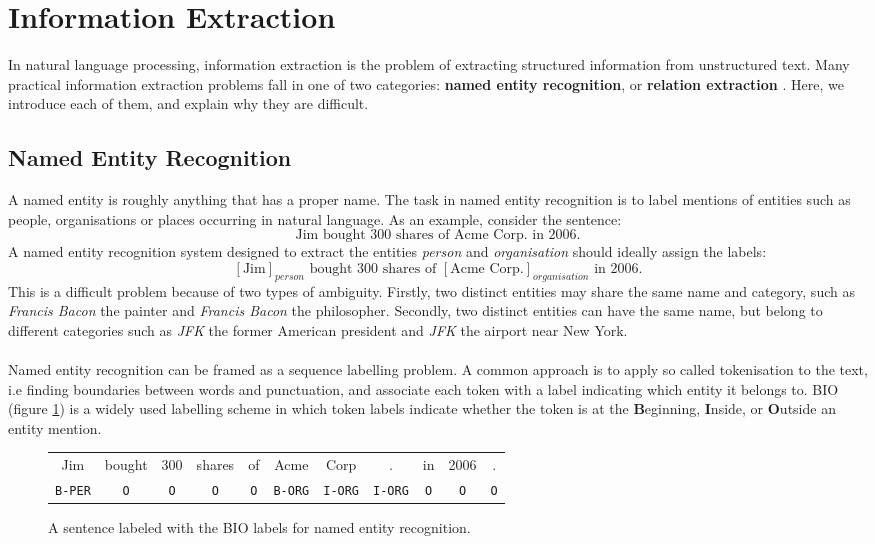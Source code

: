 \section{Information Extraction}
\label{information_extraction}
In natural language processing, information extraction is the problem of extracting structured information from unstructured text. Many practical information extraction problems fall in one of two categories: \textbf{named entity recognition}, or \textbf{relation extraction} \citep{jurafsky09}. Here, we introduce each of them, and explain why they are difficult.

\subsection{Named Entity Recognition}
\label{named_entity_recognition}
A named entity is roughly anything that has a proper name. The task in named entity recognition is to label mentions of entities such as people, organisations or places occurring in natural language. As an example, consider the sentence: 
$$
\text{Jim bought 300 shares of Acme Corp. in 2006.}
$$ 
A named entity recognition system designed to extract the entities \textit{person} and \textit{organisation} should ideally assign the labels:
$$
	[\text{Jim}]_{person} \text{ bought 300 shares of } [\text{Acme Corp.}]_{organisation} \text{ in 2006.}
$$
This is a difficult problem because of two types of ambiguity. Firstly, two distinct entities may share the same name and category, such as \textit{Francis Bacon} the painter and \textit{Francis Bacon} the philosopher. Secondly, two distinct entities can have the same name, but belong to different categories such as \textit{JFK} the former American president and \textit{JFK} the airport near New York.
\\\\
Named entity recognition can be framed as a sequence labelling problem. A common approach is to apply so called tokenisation to the text, i.e finding boundaries between words and punctuation, and associate each token with a label indicating which entity it belongs to. BIO (figure \ref{bio}) is a widely used labelling scheme in which token labels indicate whether the token is at the \textbf{B}eginning, \textbf{I}nside, or \textbf{O}utside an entity mention.
\begin{figure}
	\begin{center}
		\begin{tabular}{c c c c c c c c c c c}
	Jim & bought & 300 & shares & of & Acme & Corp & . & in & 2006 & . \\
	\texttt{B-PER} & \texttt{O} & \texttt{O} & \texttt{O} & \texttt{O} & \texttt{B-ORG} & \texttt{I-ORG} & \texttt{I-ORG} & \texttt{O} & \texttt{O} & \texttt{O}
	\end{tabular}
	\end{center}
	\caption{A sentence labeled with the BIO labels for named entity recognition.}
	\label{bio}
\end{figure}

